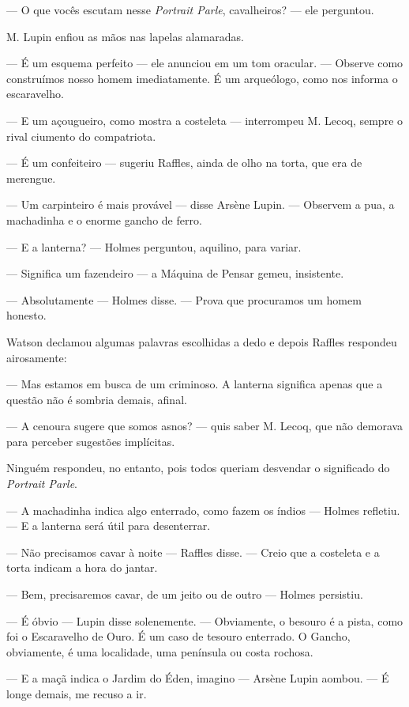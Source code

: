 --- O que vocês escutam nesse \emph{Portrait Parle}, cavalheiros? ---
ele perguntou.

M. Lupin enfiou as mãos nas lapelas alamaradas.

--- É um esquema perfeito --- ele anunciou em um tom oracular. ---
Observe como construímos nosso homem imediatamente. É um arqueólogo,
como nos informa o escaravelho.

--- E um açougueiro, como mostra a costeleta --- interrompeu M. Lecoq,
sempre o rival ciumento do compatriota.

--- É um confeiteiro --- sugeriu Raffles, ainda de olho na torta, que
era de merengue.

--- Um carpinteiro é mais provável --- disse Arsène Lupin. --- Observem
a pua, a machadinha e o enorme gancho de ferro.

--- E a lanterna? --- Holmes perguntou, aquilino, para variar.

--- Significa um fazendeiro --- a Máquina de Pensar gemeu, insistente.

--- Absolutamente --- Holmes disse. --- Prova que procuramos um homem
honesto.

Watson declamou algumas palavras escolhidas a dedo e depois Raffles
respondeu airosamente:

--- Mas estamos em busca de um criminoso. A lanterna significa apenas
que a questão não é sombria demais, afinal.

--- A cenoura sugere que somos asnos? --- quis saber M. Lecoq, que não
demorava para perceber sugestões implícitas.

Ninguém respondeu, no entanto, pois todos queriam desvendar o
significado do \emph{Portrait Parle}.

--- A machadinha indica algo enterrado, como fazem os índios --- Holmes
refletiu. --- E a lanterna será útil para desenterrar.

--- Não precisamos cavar à noite --- Raffles disse. --- Creio que a
costeleta e a torta indicam a hora do jantar.

--- Bem, precisaremos cavar, de um jeito ou de outro --- Holmes
persistiu.

--- É óbvio --- Lupin disse solenemente. --- Obviamente, o besouro é a
pista, como foi o Escaravelho de Ouro. É um caso de tesouro enterrado. O
Gancho, obviamente, é uma localidade, uma península ou costa rochosa.

--- E a maçã indica o Jardim do Éden, imagino --- Arsène Lupin aombou.
--- É longe demais, me recuso a ir.

